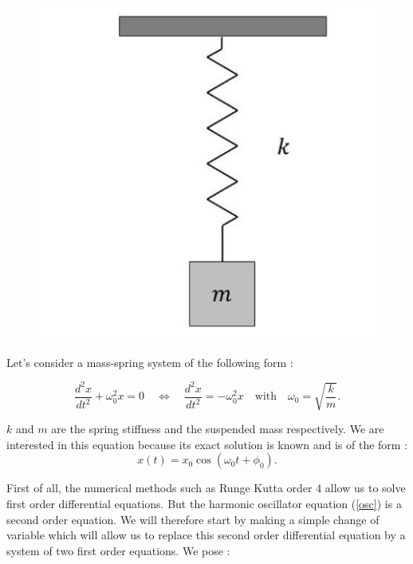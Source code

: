 \documentclass[12pt]{article}
\begin{document}
\begin{figure}[H]
\begin{minipage}[t]{0.48\linewidth}
		\includegraphics[width=\linewidth]{"images/Diff_equation/Harmonic_oss_2.png"}
	\end{minipage}
    \end{figure}
	
	\newpage
	
	\noindent Let's consider a mass-spring system of the following form :

    \begin{equation}
    	\frac{d^2 x}{d t^2}+\omega_0^2 x = 0 \quad \iff \quad \frac{d^2 x}{d t^2}=-\omega_0^2 x \quad \text{with} \quad \omega_0=\sqrt{\frac{k}{m}}.
    	\label{osc}
    \end{equation}
    
    \noindent $k$ and $m$ are the spring stiffness and the suspended mass respectively. We are interested in this equation because its exact solution is known and is of the form :
    $$x(t) = x_0 \cos(\omega_{0}t+\phi_0).$$
    
    \noindent First of all, the numerical methods such as Runge Kutta order 4  allow us to solve first order differential equations. But the harmonic oscillator equation (\ref{osc}) is a second order equation. We will therefore start by making a simple change of variable which will allow us to replace this second order differential equation by a system of two first order equations. We pose :
     
\end{document}
